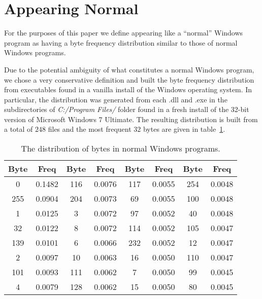 \documentclass[finalcopy,short]{srpaper}
\begin{document}
    \section{Appearing Normal}

        For the purposes of this paper we define appearing like a ``normal''
        Windows program as having a byte frequency distribution similar to those
        of normal Windows programs. 
        
        Due to the potential ambiguity of what constitutes a normal Windows
        program, we chose a very conservative definition and built the byte
        frequency distribution from executables found in a vanilla install of
        the Windows operating system. In particular, the distribution was
        generated from each {.dll} and {.exe} in the subdirectories of
        \emph{C:/Program Files/} folder found in a fresh install of the 32-bit
        version of Microsoft Windows 7 Ultimate. The resulting distribution is
        built from a total of $248$ files and the most frequent $32$ bytes are
        given in table~\ref{tab:results-windows-dist}.

        \begin{table}
            \centering
            \begin{tabular}{|c|c||c|c||c|c||c|c|}
                \hline
                Byte & Freq & Byte & Freq & Byte & Freq & Byte & Freq \\
                \hline
                0 & 0.1482 & 116 & 0.0076 & 117 & 0.0055 & 254 & 0.0048 \\
                \hline
                255 & 0.0904 & 204 & 0.0073 & 69 & 0.0055 & 100 & 0.0048 \\
                \hline
                1 & 0.0125 & 3 & 0.0072 & 97 & 0.0052 & 40 & 0.0048 \\
                \hline
                32 & 0.0122 & 8 & 0.0072 & 114 & 0.0052 & 105 & 0.0047 \\
                \hline
                139 & 0.0101 & 6 & 0.0066 & 232 & 0.0052 & 12 & 0.0047 \\
                \hline
                2 & 0.0097 & 10 & 0.0063 & 16 & 0.0050 & 110 & 0.0047 \\
                \hline
                101 & 0.0093 & 111 & 0.0062 & 7 & 0.0050 & 99 & 0.0045 \\
                \hline
                4 & 0.0079 & 128 & 0.0062 & 15 & 0.0050 & 80 & 0.0045 \\
                \hline
            \end{tabular}
            \caption{The distribution of bytes in normal Windows programs.}
            \label{tab:results-windows-dist}
        \end{table}
\end{document}
